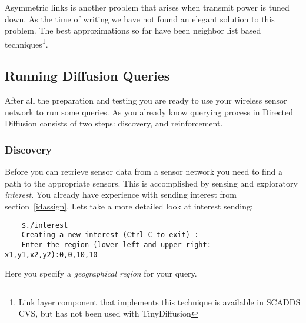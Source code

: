 \documentclass[11pt,onecolumn]{article}
\begin{document}
Asymmetric links is another problem that arises when transmit power is
tuned down. As the time of writing we have not found an elegant
solution to this problem. The best approximations so far have been 
neighbor list based techniques\footnote{Link layer component that
implements this technique is available in SCADDS CVS, but has not been used
with TinyDiffusion}.

\subsection{Running Diffusion Queries}
After all the preparation and testing you are ready to use your
wireless sensor network to run some queries. As you already know
querying process in Directed Diffusion consists of two steps:
discovery, and reinforcement.

\subsubsection{Discovery}
Before you can retrieve sensor data from a sensor network you need to
find a path to the appropriate sensors. This is accomplished by
sensing and exploratory \emph{interest}. You already have experience
with sending interest from section~\ref{idassign}. Lets take a more
detailed look at interest sending:

\begin{verbatim}
	$./interest 
	Creating a new interest (Ctrl-C to exit) :
	Enter the region (lower left and upper right: x1,y1,x2,y2):0,0,10,10
\end{verbatim}%
Here you specify a \emph{geographical region} for your query. 
\end{document}
